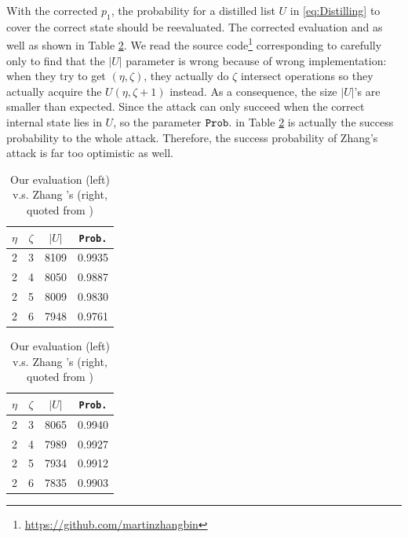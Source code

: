 With the corrected $p_1$, the probability for a distilled list $U$ in \eqref{eq:Distilling} to cover the correct state  should be reevaluated.
The corrected evaluation and as well as shown in Table \ref{tab:ProbInU}.
We read the source code\footnote{\url{https://github.com/martinzhangbin}} corresponding to \cite{AC:Zhang19} carefully only to find that the $|U|$ parameter is wrong because of wrong implementation:
when they try to get $(\eta , \zeta)$, they actually do $\zeta$ intersect operations so they actually acquire the $U(\eta,\zeta+1)$ instead.
As a consequence, the size $|U|$'s are smaller than expected. 
Since the attack can only succeed when the correct internal state lies in $U$, so the parameter ${\tt Prob.}$ in Table \ref{tab:ProbInU} is actually the success probability to the whole attack.
Therefore, the success probability of Zhang's attack is far too optimistic as well.
\begin{table}[htbp]
  \centering
  \caption{Our evaluation (left) v.s. Zhang \etal's (right, quoted from \cite{AC:Zhang19})}
  \begin{minipage}[t]{0.45\textwidth}
  \centering
     \begin{tabular}{c|c|c|c}
    \hline
    $\eta$ & $\zeta$ & $|U|$ & {\tt Prob.} \\
    \hline
    \hline
    2     & 3     & 8109  & 0.9935 \\
    2     & 4     & 8050  & 0.9887 \\
    2     & 5     & 8009  & 0.9830 \\
    2     & 6     & 7948  & 0.9761 \\
    \hline
    \end{tabular}%
  \end{minipage}
  \begin{minipage}[t]{0.45\textwidth}
    \centering
        \begin{tabular}{c|c|c|c}
    \hline
   $\eta$ & $\zeta$  & $|U|$ & {\tt Prob.} \\
    \hline
    \hline
    2     & 3     & 8065  & 0.9940 \\
    2     & 4     & 7989  & 0.9927 \\
    2     & 5     & 7934  & 0.9912 \\
    2     & 6     & 7835  & 0.9903 \\
    \hline
    \end{tabular}%
  \end{minipage}
  \label{tab:ProbInU}%
\end{table}%


